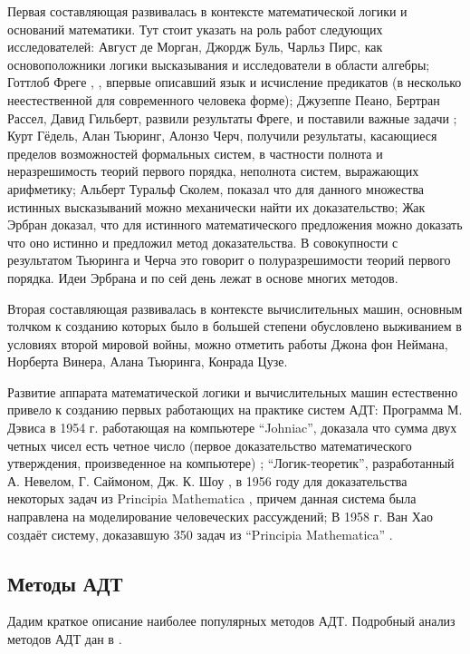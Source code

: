 Первая составляющая развивалась в контексте математической логики и оснований математики. Тут стоит указать на роль работ следующих исследователей: Август де Морган, Джордж Буль, Чарльз Пирс, как основоположники логики высказывания и исследователи в области алгебры; Готтлоб Фреге \cite{Frege}, \cite{Sourcebook}, впервые описавший язык и исчисление предикатов (в несколько неестественной для современного человека форме); Джузеппе Пеано, Бертран Рассел, Давид Гильберт, развили результаты Фреге, и поставили важные задачи \cite{GilbertAkkerman}; Курт Гёдель, Алан Тьюринг, Алонзо Черч, получили результаты, касающиеся пределов возможностей формальных систем, в частности полнота \cite{Godel1} и неразрешимость теорий первого порядка, неполнота систем, выражающих арифметику; Альберт Туральф Сколем, показал что для данного множества истинных высказываний можно механически найти их доказательство; Жак Эрбран доказал, что для истинного математического предложения можно доказать что оно истинно и предложил метод доказательства. В совокупности с результатом Тьюринга и Черча это говорит о полуразрешимости теорий первого порядка. Идеи Эрбрана и по сей день лежат в основе многих методов.

Вторая составляющая развивалась в контексте вычислительных машин, основным толчком к созданию которых было в большей степени обусловлено выживанием в условиях второй мировой войны, можно отметить работы Джона фон Неймана, Норберта Винера, Алана Тьюринга, Конрада Цузе.

Развитие аппарата математической логики и вычислительных машин естественно привело к созданию первых работающих на практике систем АДТ: Программа М. Дэвиса в 1954 г. работающая на компьютере ``Johniac'', доказала что сумма двух четных чисел есть четное число (первое доказательство математического утверждения, произведенное на компьютере) \cite{LogicComp}; ``Логик-теоретик'', разработанный А. Невелом, Г. Саймоном, Дж. К. Шоу \cite{Newell1}, \cite{Newell2} в 1956 году для доказательства некоторых задач из Principia Mathematica \cite{PrinMat}, причем данная система была направлена на моделирование человеческих рассуждений; В 1958 г. Ван Хао создаёт систему, доказавшую 350 задач из ``Principia Mathematica'' \cite{WangHao}.


\subsection{Методы АДТ}
Дадим краткое описание наиболее популярных методов АДТ. Подробный анализ методов АДТ дан в \cite{HAR}.

